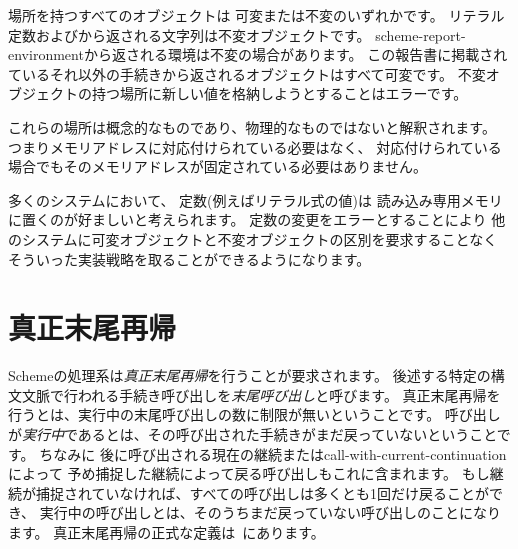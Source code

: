 場所を持つすべてのオブジェクトは
可変または不変のいずれかです。
リテラル定数およびから返される文字列は不変オブジェクトです。
{\cf scheme-\+report-\+environment}から返される環境は不変の場合があります。
この報告書に掲載されているそれ以外の手続きから返されるオブジェクトはすべて可変です。
不変オブジェクトの持つ場所に新しい値を格納しようとすることはエラーです。


これらの場所は概念的なものであり、物理的なものではないと解釈されます。
つまりメモリアドレスに対応付けられている必要はなく、
対応付けられている場合でもそのメモリアドレスが固定されている必要はありません。

\begin{rationale}
多くのシステムにおいて、
定数(例えばリテラル式の値)は
読み込み専用メモリに置くのが好ましいと考えられます。
定数の変更をエラーとすることにより
他のシステムに可変オブジェクトと不変オブジェクトの区別を要求することなく
そういった実装戦略を取ることができるようになります。
\end{rationale}

\section{真正末尾再帰}
\label{proper tail recursion}

Schemeの処理系は{\em 真正末尾再帰}を行うことが要求されます。
後述する特定の構文文脈で行われる手続き呼び出しを{\em 末尾呼び出し}と呼びます。
真正末尾再帰を行うとは、実行中の末尾呼び出しの数に制限が無いということです。
呼び出しが{\em 実行中}であるとは、その呼び出された手続きがまだ戻っていないということです。
ちなみに
後に呼び出される現在の継続または{\cf call-with-current-continuation}によって
予め捕捉した継続によって戻る呼び出しもこれに含まれます。
もし継続が捕捉されていなければ、すべての呼び出しは多くとも1回だけ戻ることができ、
実行中の呼び出しとは、そのうちまだ戻っていない呼び出しのことになります。
真正末尾再帰の正式な定義は\cite{propertailrecursion}~にあります。

